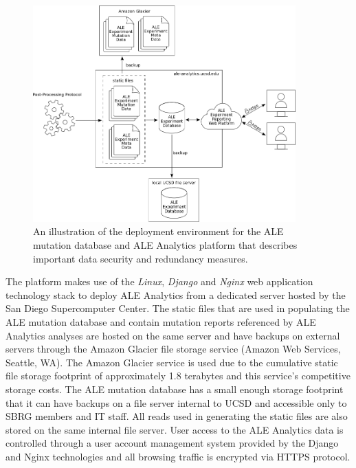 \documentclass[12pt,final,masters,chapterheads]{ucsd}  %
\begin{document}
\begin{figure}[H]
  \centering
  \includegraphics[width=0.9\textwidth]{deployment_diagram.png}
  \caption{An illustration of the deployment environment for the ALE mutation database and ALE Analytics platform that describes important data security and redundancy measures.}
  \label{fig:deployment_diagram}
\end{figure}

The platform makes use of the \textit{Linux}, \textit{Django} \cite{django} and \textit{Nginx} \cite{nginx} web application technology stack to deploy ALE Analytics from a dedicated server hosted by the San Diego Supercomputer Center. The static files that are used in populating the ALE mutation database and contain mutation reports referenced by ALE Analytics analyses are hosted on the same server and have backups on external servers through the Amazon Glacier file storage service (Amazon Web Services, Seattle, WA). The Amazon Glacier service is used due to the cumulative static file storage footprint of approximately 1.8 terabytes and this service's competitive storage costs. The ALE mutation database has a small enough storage footprint that it can have backups on a file server internal to UCSD and accessible only to SBRG members and IT staff. All reads used in generating the static files are also stored on the same internal file server. User access to the ALE Analytics data is controlled through a user account management system provided by the Django and Nginx technologies and all browsing traffic is encrypted via HTTPS protocol.
\end{document}
